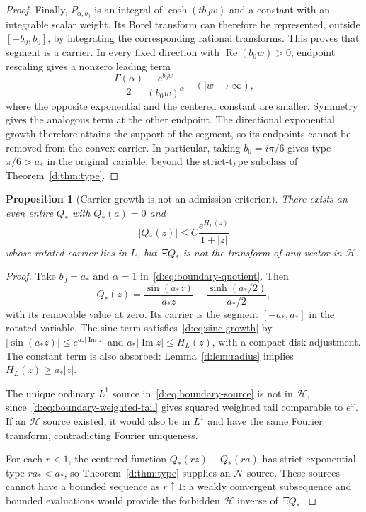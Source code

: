 \documentclass[11pt,a4paper]{article}
\numberwithin{equation}{section}
\newtheorem{proposition}[theorem]{Proposition}
\theoremstyle{definition}\newtheorem{definition}[theorem]{Definition}
\theoremstyle{remark}\newtheorem{remark}[theorem]{Remark}
\newcommand{\Hh}{\mathcal H}\newcommand{\Hw}{\mathcal H}
\newcommand{\Nn}{\mathcal N}\newcommand{\Ii}{\mathcal I}\newcommand{\Zz}{\mathcal Z}
\begin{document}
\begin{proof}
Finally, $P_{\alpha,b_0}$ is an integral of $\cosh(tb_0w)$ and a constant with an integrable scalar weight. Its Borel transform can therefore be represented, outside $[-b_0,b_0]$, by integrating the corresponding rational transforms. This proves that segment is a carrier. In every fixed direction with $\operatorname{Re}(b_0w)>0$, endpoint rescaling gives a nonzero leading term
\[
 \frac{\Gamma(\alpha)}2\,\frac{e^{b_0w}}{(b_0w)^\alpha}
 \quad(|w|\to\infty),
\]
where the opposite exponential and the centered constant are smaller. Symmetry gives the analogous term at the other endpoint. The directional exponential growth therefore attains the support of the segment, so its endpoints cannot be removed from the convex carrier. In particular, taking $b_0=i\pi/6$ gives type $\pi/6>a_*$ in the original variable, beyond the strict-type subclass of Theorem~\ref{d:thm:type}.
\end{proof}

\begin{proposition}[Carrier growth is not an admission criterion]\label{d:prop:sinc-warning}
There exists an even entire $Q_*$ with $Q_*(a)=0$ and
\begin{equation}\label{d:eq:sinc-growth}
 |Q_*(z)|\le C\frac{e^{H_L(z)}}{1+|z|}
\end{equation}
whose rotated carrier lies in $L$, but $\Xi Q_*$ is not the transform of any vector in $\Hh$.
\end{proposition}
\begin{proof}
Take $b_0=a_*$ and $\alpha=1$ in~\eqref{d:eq:boundary-quotient}. Then
\begin{equation}\label{d:eq:sinc-quotient}
 Q_*(z)=\frac{\sin(a_*z)}{a_*z}
        -\frac{\sinh(a_*/2)}{a_*/2},
\end{equation}
with its removable value at zero. Its carrier is the segment $[-a_*,a_*]$ in the rotated variable. The sinc term satisfies~\eqref{d:eq:sinc-growth} by
$|\sin(a_*z)|\le e^{a_*|\operatorname{Im}z|}$ and
$a_*|\operatorname{Im}z|\le H_L(z)$, with a compact-disk adjustment. The constant term is also absorbed: Lemma~\ref{d:lem:radius} implies $H_L(z)\ge a_*|z|$.

The unique ordinary $L^1$ source in~\eqref{d:eq:boundary-source} is not in $\Hh$, since~\eqref{d:eq:boundary-weighted-tail} gives squared weighted tail comparable to $e^x$. If an $\Hh$ source existed, it would also be in $L^1$ and have the same Fourier transform, contradicting Fourier uniqueness.

For each $r<1$, the centered function $Q_*(rz)-Q_*(ra)$ has strict exponential type $ra_*<a_*$, so Theorem~\ref{d:thm:type} supplies an $\Nn$ source. These sources cannot have a bounded sequence as $r\uparrow1$: a weakly convergent subsequence and bounded evaluations would provide the forbidden $\Hh$ inverse of $\Xi Q_*$.
\end{proof}
\end{document}
